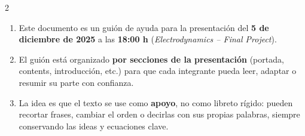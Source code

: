 \documentclass{article}
\newenvironment{MyColorPar}[1]{%
\leavevmode\color{#1}\ignorespaces%
}{%
}%
\begin{document}
\setlength{\columnsep}{2cm}
\begin{multicols}{2}

\begin{enumerate}[label={{\textcolor{trueblue}{\textbf{Guía}. \arabic*.0}}}, start=1]

  \item Este documento es un guión de ayuda para la presentación del \textbf{5 de diciembre de 2025} a las \textbf{18:00 h} (\textit{Electrodynamics -- Final Project}).

  \item El guión está organizado \textbf{por secciones de la presentación} (portada, contents, introducción, etc.) para que cada integrante pueda leer, adaptar o resumir su parte con confianza.

  \item La idea es que el texto se use como \textbf{apoyo}, no como libreto rígido: pueden recortar frases, cambiar el orden o decirlas con sus propias palabras, siempre conservando las ideas y ecuaciones clave.

\end{enumerate}
\end{multicols}

\vspace{2cm}

\begin{MyColorPar}{orange(colorwheel)}
\end{MyColorPar}

\tableofcontents \newpage

\hypersetup{linkcolor=trueblue}

\begin{center}
\end{center}  \vspace{2cm}
\end{document}

